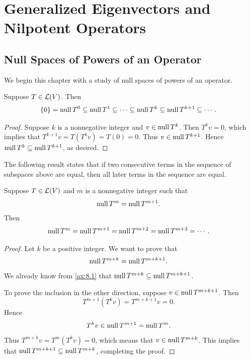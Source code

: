 \DeclareRobustCommand\axeqnum[1]{\refstepcounter{theorem}\label{ax:#1}}

\section{Generalized Eigenvectors and Nilpotent Operators}

\subsection{Null Spaces of Powers of an Operator}

We begin this chapter with a study of null spaces of powers of an operator.

\begin{result}\label{ax:8.1}
Suppose $T\in\mathcal{L}(V)$. Then
\[ \{0\} = \operatorname{null} T^0 \subseteq \operatorname{null} T^1 \subseteq \cdots \subseteq \operatorname{null} T^k
   \subseteq \operatorname{null} T^{k+1} \subseteq \cdots. \]
\end{result}

\begin{proof}
Suppose $k$ is a nonnegative integer and $v\in\operatorname{null} T^k$. Then $T^kv=0$, which
implies that $T^{k+1}v=T(T^kv)=T(0)=0$. Thus $v\in\operatorname{null} T^{k+1}$. Hence
$\operatorname{null} T^k\subseteq\operatorname{null} T^{k+1}$, as desired.
\end{proof}

%
The following result states that if two consecutive terms in the sequence of
subspaces above are equal, then all later terms in the sequence are equal.

\begin{result}\label{ax:8.2}
Suppose $T\in\mathcal{L}(V)$ and $m$ is a nonnegative integer such that
\[ \operatorname{null} T^m = \operatorname{null} T^{m+1}. \]
Then
\[ \operatorname{null} T^m = \operatorname{null} T^{m+1} = \operatorname{null} T^{m+2} = \operatorname{null} T^{m+3} = \cdots. \]
\end{result}

\begin{proof}
Let $k$ be a positive integer. We want to prove that
\[ \operatorname{null} T^{m+k} = \operatorname{null} T^{m+k+1}. \]
We already know from \ref{ax:8.1} that $\operatorname{null} T^{m+k}\subseteq\operatorname{null} T^{m+k+1}$.

To prove the inclusion in the other direction, suppose $v\in\operatorname{null} T^{m+k+1}$.
Then
\[ T^{m+1}(T^kv) = T^{m+k+1}v = 0. \]
Hence
\[ T^kv\in\operatorname{null} T^{m+1} = \operatorname{null} T^m. \]
Thus $T^{m+k}v=T^m(T^kv)=0$, which means that $v\in\operatorname{null} T^{m+k}$. This implies
that $\operatorname{null} T^{m+k+1}\subseteq\operatorname{null} T^{m+k}$, completing the proof.
\end{proof}


